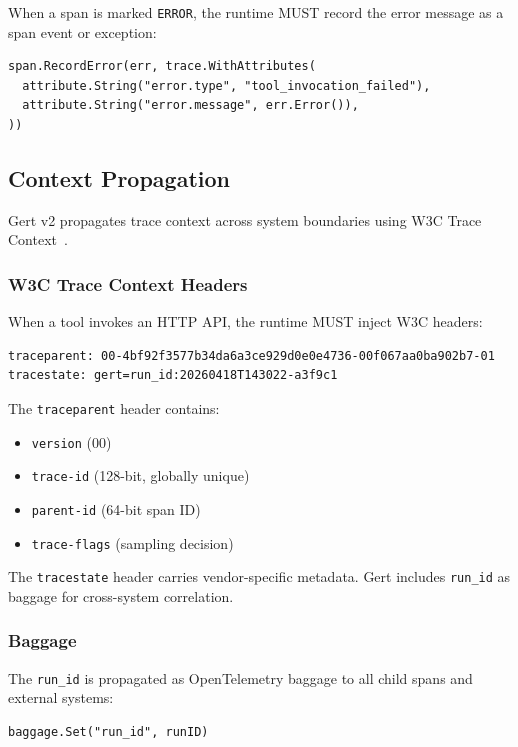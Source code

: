 When a span is marked \texttt{ERROR}, the runtime MUST record the error message as a span event or exception:

\begin{verbatim}
span.RecordError(err, trace.WithAttributes(
  attribute.String("error.type", "tool_invocation_failed"),
  attribute.String("error.message", err.Error()),
))
\end{verbatim}

\subsection{Context Propagation}

Gert v2 propagates trace context across system boundaries using W3C Trace Context~\cite{w3c-trace-context}.

\subsubsection{W3C Trace Context Headers}

When a tool invokes an HTTP API, the runtime MUST inject W3C headers:

\begin{verbatim}
traceparent: 00-4bf92f3577b34da6a3ce929d0e0e4736-00f067aa0ba902b7-01
tracestate: gert=run_id:20260418T143022-a3f9c1
\end{verbatim}

The \texttt{traceparent} header contains:
\begin{itemize}
  \item \texttt{version} (00)
  \item \texttt{trace-id} (128-bit, globally unique)
  \item \texttt{parent-id} (64-bit span ID)
  \item \texttt{trace-flags} (sampling decision)
\end{itemize}

The \texttt{tracestate} header carries vendor-specific metadata. Gert includes \texttt{run\_id} as baggage for cross-system correlation.

\subsubsection{Baggage}

The \texttt{run\_id} is propagated as OpenTelemetry baggage to all child spans and external systems:

\begin{verbatim}
baggage.Set("run_id", runID)
\end{verbatim}

